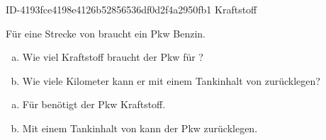 \begin{exercise}
    {ID-4193fce4198e4126b52856536df0d2f4a2950fb1}
    {Kraftstoff}
\ifproblem\problem\par
  Für eine Strecke von  braucht ein Pkw  Benzin.
  \begin{enumerate}[a)]
    \item Wie viel Kraftstoff braucht der Pkw für ?
    \item Wie viele Kilometer kann er mit einem Tankinhalt von  zurücklegen?
  \end{enumerate}
\fi
\ifoutcome\outcome\par
  \begin{enumerate}[a)]
    \item Für  benötigt der Pkw  Kraftstoff.
    \item Mit einem Tankinhalt von  kann der Pkw  zurücklegen.
  \end{enumerate}
\fi
\end{exercise}
